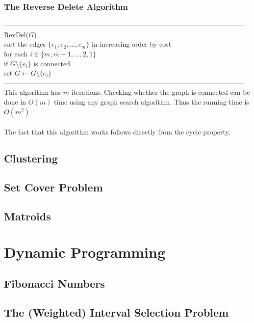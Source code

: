 \documentclass{article}
\begin{document}
\subsubsection{The Reverse Delete Algorithm}
---------------------------------------------------------------------------------------------------------
RevDel($G$)\\
	\hspace*{7mm} sort the edges $\{e_1, e_2, \dots, e_m\}$ in increasing order by cost\\
	\hspace*{7mm} for each $i \in \{m, m-1, \dots, 2, 1\}$\\
	\hspace*{14mm} if $G \setminus \{e_i\}$ is connected\\
	\hspace*{21mm} set $G \leftarrow G \setminus \{e_i\}$\\
---------------------------------------------------------------------------------------------------------\\
This algorithm has $m$ iterations. Checking whether the graph is connected can be done in $O(m)$ time using any graph search algorithm. Thus the running time is $O(m^2)$.\\\\
The fact that this algorithm works follows directly from the cycle property.
\subsection{Clustering}
\subsection{Set Cover Problem}
\subsection{Matroids}
\newpage


\section{Dynamic Programming}
\subsection{Fibonacci Numbers}
\subsection{The (Weighted) Interval Selection Problem}
\end{document}
